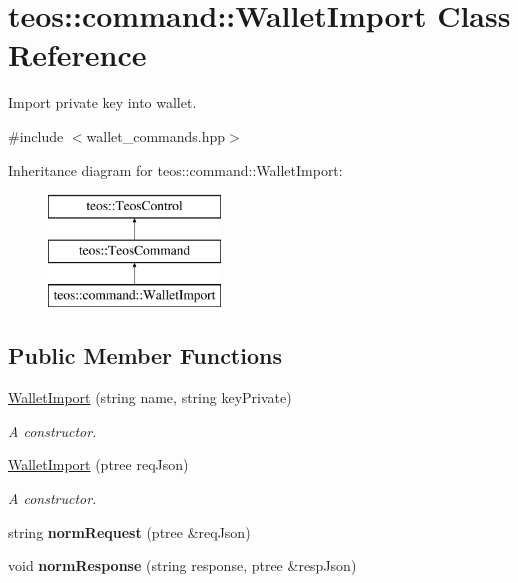 \hypertarget{classteos_1_1command_1_1_wallet_import}{}\section{teos\+:\+:command\+:\+:Wallet\+Import Class Reference}
\label{classteos_1_1command_1_1_wallet_import}


Import private key into wallet.  




{\ttfamily \#include $<$wallet\+\_\+commands.\+hpp$>$}

Inheritance diagram for teos\+:\+:command\+:\+:Wallet\+Import\+:\begin{figure}[H]
\begin{center}
\leavevmode
\includegraphics[height=3.000000cm]{classteos_1_1command_1_1_wallet_import}
\end{center}
\end{figure}
\subsection*{Public Member Functions}
\begin{DoxyCompactItemize}
\item 
\mbox{\hyperlink{classteos_1_1command_1_1_wallet_import_afcf1166b4ac17b4cd6cfeb02cbba7233}{Wallet\+Import}} (string name, string key\+Private)
\begin{DoxyCompactList}\small\item\em A constructor. \end{DoxyCompactList}\item 
\mbox{\hyperlink{classteos_1_1command_1_1_wallet_import_af8b0bf00655b26891fa3091aa4e92907}{Wallet\+Import}} (ptree req\+Json)
\begin{DoxyCompactList}\small\item\em A constructor. \end{DoxyCompactList}\item 
\mbox{\label{classteos_1_1command_1_1_wallet_import_a9f2be518b7a2fdd12573a93bc29c92a7}} 
string {\bfseries norm\+Request} (ptree \&req\+Json)
\item 
\mbox{\label{classteos_1_1command_1_1_wallet_import_ae4a1ce8284a4482555c778f2aca17722}} 
void {\bfseries norm\+Response} (string response, ptree \&resp\+Json)
\end{DoxyCompactItemize}

